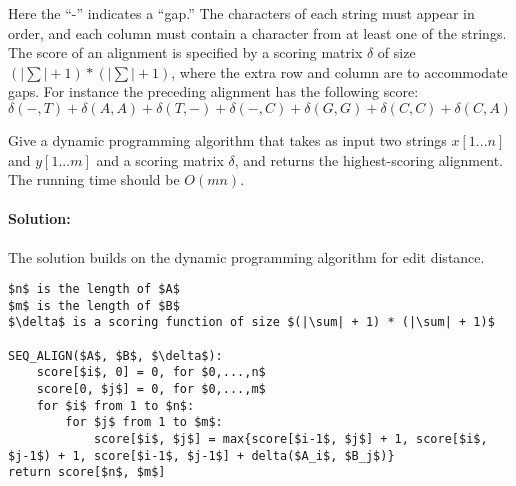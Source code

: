 \documentclass[12pt]{article}
\newcommand{\BigO}[1]{\ensuremath{O(#1)}}
\begin{document}
Here the ``-'' indicates a ``gap.'' The characters of each string must appear
in order, and each column must contain a character from at least one of 
the strings. The score of an alignment is specified by a scoring matrix
$\delta$
of size $(|\sum| + 1) * (|\sum| + 1)$, where the extra row and column are to
accommodate gaps. For instance the preceding alignment has the following score:
$$\delta(-, T ) + \delta(A, A) + \delta(T, -) + \delta(-, C) + \delta(G,
G) + \delta(C, C) + \delta(C, A)$$

Give a dynamic programming algorithm that takes as input two strings
$x[1 . . . n]$ and $y[1 . . . m]$ and a scoring matrix $\delta$, and returns
the highest-scoring alignment. The running time should be $\BigO{mn}$.

\paragraph{Solution:}
The solution builds on the dynamic programming algorithm for edit distance.
\begin{lstlisting}[mathescape]
$n$ is the length of $A$
$m$ is the length of $B$
$\delta$ is a scoring function of size $(|\sum| + 1) * (|\sum| + 1)$

SEQ_ALIGN($A$, $B$, $\delta$):
	score[$i$, 0] = 0, for $0,...,n$
	score[0, $j$] = 0, for $0,...,m$
	for $i$ from 1 to $n$:
		for $j$ from 1 to $m$:
			score[$i$, $j$] = max{score[$i-1$, $j$] + 1, score[$i$, $j-1$) + 1, score[$i-1$, $j-1$] + delta($A_i$, $B_j$)}
return score[$n$, $m$]
\end{lstlisting}
\end{document}
